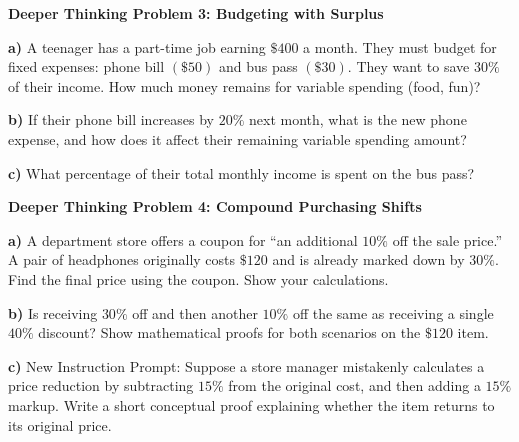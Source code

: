 \documentclass[12pt, letterpaper, fleqn]{article}
\begin{document}
\begin{tcolorbox}[colback=white, colframe=black, boxrule=1pt, arc=4mm, left=6mm, right=6mm, top=5mm, bottom=5mm]
\textbf{Deeper Thinking Problem 3: Budgeting with Surplus}

\medskip

\noindent
\textbf{a)} A teenager has a part-time job earning $\$400$ a month. They must budget for fixed expenses: phone bill $(\$50)$ and bus pass $(\$30)$. They want to save $30\%$ of their income. How much money remains for variable spending (food, fun)?

\vspace{5cm}

\noindent
\textbf{b)} If their phone bill increases by $20\%$ next month, what is the new phone expense, and how does it affect their remaining variable spending amount?

\vspace{6cm}

\noindent
\textbf{c)} What percentage of their total monthly income is spent on the bus pass?

\vspace{5cm}
\end{tcolorbox}

\vspace{3mm}

\begin{tcolorbox}[colback=white, colframe=black, boxrule=1pt, arc=4mm, left=6mm, right=6mm, top=5mm, bottom=5mm]
\textbf{Deeper Thinking Problem 4: Compound Purchasing Shifts}

\medskip

\noindent
\textbf{a)} A department store offers a coupon for ``an additional $10\%$ off the sale price.'' A pair of headphones originally costs $\$120$ and is already marked down by $30\%$. Find the final price using the coupon. Show your calculations.

\vspace{5cm}

\noindent
\textbf{b)} Is receiving $30\%$ off and then another $10\%$ off the same as receiving a single $40\%$ discount? Show mathematical proofs for both scenarios on the $\$120$ item.

\vspace{5cm}

\noindent
\textbf{c)} New Instruction Prompt: Suppose a store manager mistakenly calculates a price reduction by subtracting $15\%$ from the original cost, and then adding a $15\%$ markup. Write a short conceptual proof explaining whether the item returns to its original price.

\vspace{5cm}
\end{tcolorbox}
\end{document}
